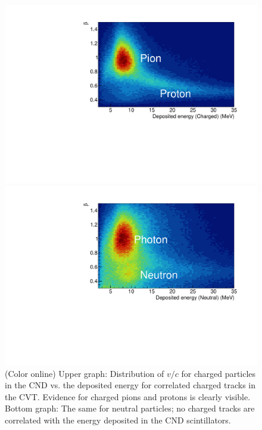 \documentclass[final,3p,twocolumn]{elsarticle}
\begin{document}
\begin{figure}[t!]
\centerline{\includegraphics[width=1.\columnwidth]{CND-BetaE.pdf}}
\centerline{\includegraphics[width=1.\columnwidth]{CND-BetaENeutral.pdf}}
\caption{(Color online) Upper graph: Distribution of $v/c$ for charged particles in the CND vs. the deposited energy for correlated
charged tracks in the CVT. Evidence for charged pions and protons is clearly visible.  Bottom graph: The same for
neutral particles; no charged tracks are correlated with the energy deposited in the CND scintillators.} 
\label{CND-neutrals}
\end{figure} 
\end{document}
